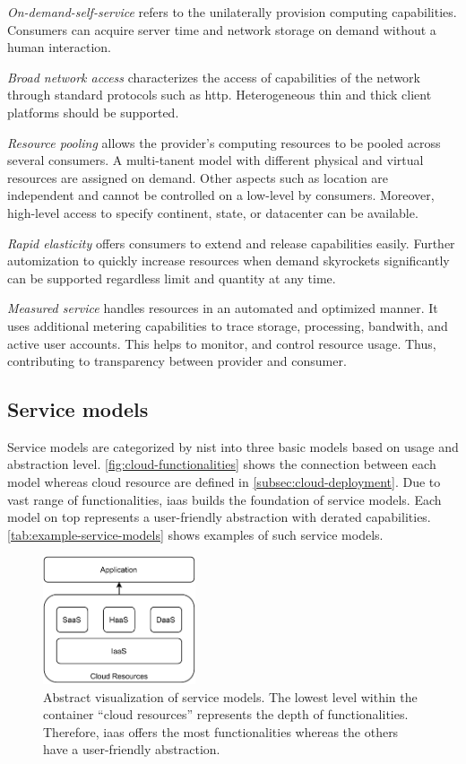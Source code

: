 \textit{On-demand-self-service} refers to the unilaterally provision computing capabilities.
Consumers can acquire server time and network storage on demand without a human interaction.

\textit{Broad network access} characterizes the access of capabilities of the network through standard protocols such as \ac{http}.
Heterogeneous thin and thick client platforms should be supported.

\textit{Resource pooling} allows the provider's computing resources to be pooled across several consumers.
A multi-tanent model with different physical and virtual resources are assigned on demand.
Other aspects such as location are independent and cannot be controlled on a low-level by consumers.
Moreover, high-level access to specify continent, state, or datacenter can be available.

\textit{Rapid elasticity} offers consumers to extend and release capabilities easily.
Further automization to quickly increase resources  when demand skyrockets significantly can be supported regardless limit and quantity at any time.

\textit{Measured service} handles resources in an automated and optimized manner.
It uses additional metering capabilities to trace storage, processing, bandwith, and active user accounts.
This helps to monitor, and control resource usage. Thus, contributing to transparency between provider and consumer.

\subsection{Service models}
\label{subsec:cloud-service}

Service models are categorized by \ac{nist} into three basic models based on usage and abstraction level.
\autoref{fig:cloud-functionalities} shows the connection between each model whereas cloud resource are defined in \autoref{subsec:cloud-deployment}.
Due to vast range of functionalities, \ac*{iaas} builds the foundation of service models.
Each model on top represents a user-friendly abstraction with derated capabilities.
\autoref{tab:example-service-models} shows examples of such service models.

\begin{figure}[h]
    \centering
    \includegraphics[width=0.4\textwidth]{figures/cloud-service-models.pdf}
    \caption[Abstract visualization of service models]{Abstract visualization of service models. The lowest level within the container \enquote{cloud resources} represents the depth of functionalities. Therefore, \ac{iaas} offers the most functionalities whereas the others have a user-friendly abstraction.}
    \label{fig:cloud-functionalities}
\end{figure}

